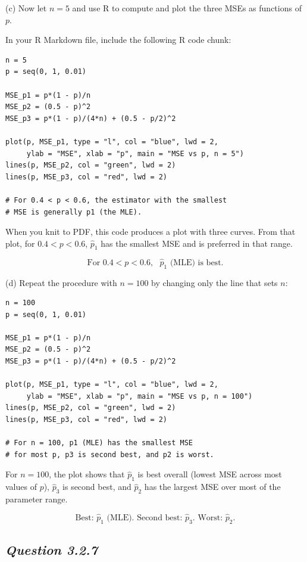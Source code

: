 \documentclass[11pt,letterpaper]{article}
\theoremstyle{remark}
\begin{document}
\medskip
(c) Now let $n = 5$ and use R to compute and plot the three MSEs as functions of $p$.

In your R Markdown file, include the following R code chunk:

\begin{verbatim}
n = 5
p = seq(0, 1, 0.01)

MSE_p1 = p*(1 - p)/n
MSE_p2 = (0.5 - p)^2
MSE_p3 = p*(1 - p)/(4*n) + (0.5 - p/2)^2

plot(p, MSE_p1, type = "l", col = "blue", lwd = 2,
     ylab = "MSE", xlab = "p", main = "MSE vs p, n = 5")
lines(p, MSE_p2, col = "green", lwd = 2)
lines(p, MSE_p3, col = "red", lwd = 2)

# For 0.4 < p < 0.6, the estimator with the smallest
# MSE is generally p1 (the MLE).
\end{verbatim}

When you knit to PDF, this code produces a plot with three curves.
From that plot, for $0.4 < p < 0.6$, $\hat{p}_1$ has the smallest MSE and is preferred in that range.

\[
\boxed{\text{For } 0.4 < p < 0.6, \text{ } \hat{p}_1 \text{ (MLE) is best.}}
\]

\medskip
(d) Repeat the procedure with $n = 100$ by changing only the line that sets $n$:

\begin{verbatim}
n = 100
p = seq(0, 1, 0.01)

MSE_p1 = p*(1 - p)/n
MSE_p2 = (0.5 - p)^2
MSE_p3 = p*(1 - p)/(4*n) + (0.5 - p/2)^2

plot(p, MSE_p1, type = "l", col = "blue", lwd = 2,
     ylab = "MSE", xlab = "p", main = "MSE vs p, n = 100")
lines(p, MSE_p2, col = "green", lwd = 2)
lines(p, MSE_p3, col = "red", lwd = 2)

# For n = 100, p1 (MLE) has the smallest MSE
# for most p, p3 is second best, and p2 is worst.
\end{verbatim}

For $n = 100$, the plot shows that $\hat{p}_1$ is best overall (lowest MSE across most values of $p$), $\hat{p}_3$ is second best, and $\hat{p}_2$ has the largest MSE over most of the parameter range.

\[
\boxed{\text{Best: } \hat{p}_1 \text{ (MLE). Second best: } \hat{p}_3. \text{ Worst: } \hat{p}_2.}
\]

\newpage

\subsection*{\textbf{\textit{Question 3.2.7}}}
\end{document}
